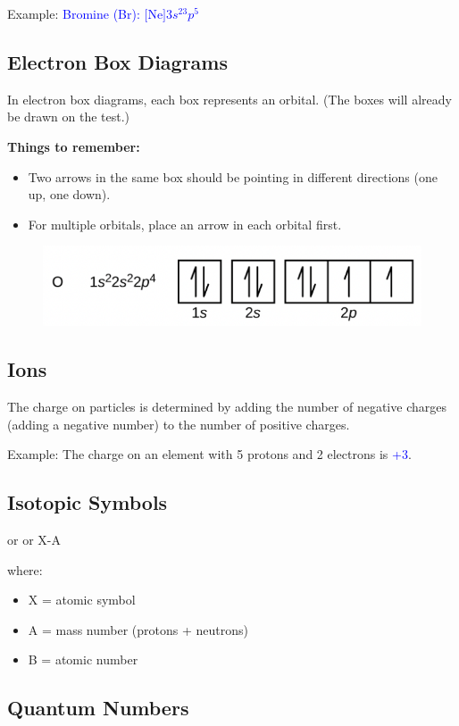 \documentclass[a4paper, 12pt]{article}
\begin{document}
Example: \textcolor{blue}{Bromine (Br): $\text{[Ne]}3s^23p^5$}

\subsection{Electron Box Diagrams}
In electron box diagrams, each box represents an orbital. (The boxes will already be drawn on the test.)

\textbf{Things to remember:}
\begin{itemize}[leftmargin=*, nosep]
    \item Two arrows in the same box should be pointing in different directions (one up, one down).
    \item For multiple orbitals, place an arrow in each orbital first.
\end{itemize}

\begin{figure}[H]
    \centering
    \includegraphics[width=0.5\linewidth]{electronboxdiagrams.png}
    \label{fig:latex hates me}
\end{figure}

\subsection{Ions}
The charge on particles is determined by adding the number of negative charges (adding a negative number) to the number of positive charges.

Example: The charge on an element with 5 protons and 2 electrons is \textcolor{blue}{+3}.

\subsection{Isotopic Symbols}
 or  or X-A

where:
\begin{itemize}[leftmargin=*, nosep]
    \item X = atomic symbol
    \item A = mass number (protons + neutrons)
    \item B = atomic number
\end{itemize}

\subsection{Quantum Numbers}
\end{document}
